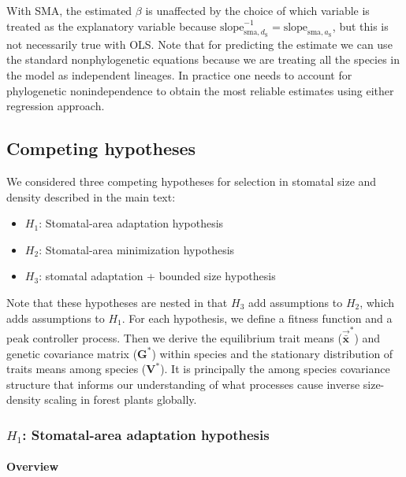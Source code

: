 \documentclass[
  letterpaper,
  DIV=11,
  numbers=noendperiod]{scrartcl}
\let\oldparagraph\paragraph
\renewcommand{\paragraph}[1]{\oldparagraph{#1}\mbox{}}
\providecommand{\tightlist}{%
  \setlength{\itemsep}{0pt}\setlength{\parskip}{0pt}}\usepackage{longtable,booktabs,array}
\begin{document}
With SMA, the estimated \(\beta\) is unaffected by the choice of which
variable is treated as the explanatory variable because
\(\text{slope}_{\text{sma},d_\mathrm{S}}^{-1} = \text{slope}_{\text{sma},a_\mathrm{S}}\),
but this is not necessarily true with OLS. Note that for predicting the
estimate we can use the standard nonphylogenetic equations because we
are treating all the species in the model as independent lineages. In
practice one needs to account for phylogenetic nonindependence to obtain
the most reliable estimates using either regression approach.

\subsection{Competing hypotheses}\label{competing-hypotheses}

We considered three competing hypotheses for selection in stomatal size
and density described in the main text:

\begin{itemize}
\tightlist
\item
  \(H_1\): Stomatal-area adaptation hypothesis
\item
  \(H_2\): Stomatal-area minimization hypothesis
\item
  \(H_3\): stomatal adaptation + bounded size hypothesis
\end{itemize}

Note that these hypotheses are nested in that \(H_3\) add assumptions to
\(H_2\), which adds assumptions to \(H_1\). For each hypothesis, we
define a fitness function and a peak controller process. Then we derive
the equilibrium trait means (\(\vec{\bar{\mathbf{x}}}^*\)) and genetic
covariance matrix (\(\mathbf{G}^*\)) within species and the stationary
distribution of traits means among species (\(\mathbf{V}^*\)). It is
principally the among species covariance structure that informs our
understanding of what processes cause inverse size-density scaling in
forest plants globally.

\subsubsection{\texorpdfstring{\(H_1\): Stomatal-area adaptation
hypothesis}{H\_1: Stomatal-area adaptation hypothesis}}\label{sec-h1}

\paragraph{Overview}\label{overview}
\end{document}
